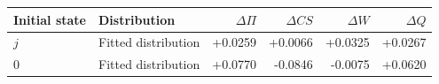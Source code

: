 \begin{tabular}{llrrrr}\toprule
Initial state & Distribution & $\Delta\Pi$ & $\Delta CS$ & $\Delta W$ & $\Delta Q$\\\midrule
$j$ & Fitted distribution & +0.0259 & +0.0066 & +0.0325 & +0.0267 \\
$0$ & Fitted distribution & +0.0770 & -0.0846 & -0.0075 & +0.0620 \\
\bottomrule\end{tabular}
